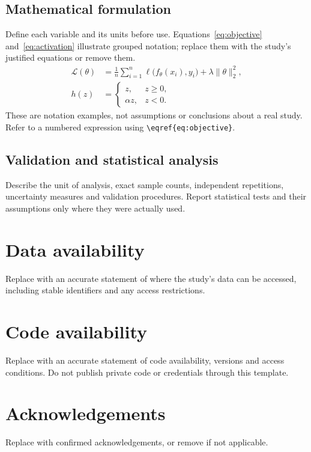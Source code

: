 \documentclass[11pt]{article}
\begin{document}
\subsection{Mathematical formulation}
Define each variable and its units before use. Equations~\eqref{eq:objective}
and~\eqref{eq:activation} illustrate grouped notation; replace them with the
study's justified equations or remove them.
\begin{subequations}\label{eq:model}
\begin{align}
  \mathcal{L}(\theta)&=\frac{1}{n}\sum_{i=1}^{n}
    \ell\bigl(f_\theta(x_i),y_i\bigr)+\lambda\lVert\theta\rVert_2^2,
    \label{eq:objective}\\
  h(z)&=\begin{cases}z,&z\geq0,\\\alpha z,&z<0.\end{cases}
    \label{eq:activation}
\end{align}
\end{subequations}
These are notation examples, not assumptions or conclusions about a real
study. Refer to a numbered expression using \verb|\eqref{eq:objective}|.

\subsection{Validation and statistical analysis}
Describe the unit of analysis, exact sample counts, independent repetitions,
uncertainty measures and validation procedures. Report statistical tests and
their assumptions only where they were actually used.

\section*{Data availability}
Replace with an accurate statement of where the study's data can be accessed,
including stable identifiers and any access restrictions.

\section*{Code availability}
Replace with an accurate statement of code availability, versions and access
conditions. Do not publish private code or credentials through this template.

\section*{Acknowledgements}
Replace with confirmed acknowledgements, or remove if not applicable.
\end{document}
